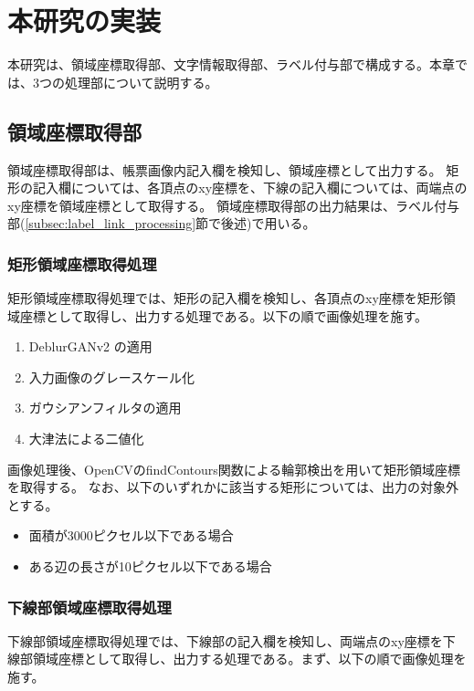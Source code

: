 \chapter{本研究の実装}\label{cha:Implementation}
本研究は、領域座標取得部、文字情報取得部、ラベル付与部で構成する。本章では、3つの処理部について説明する。


\section{領域座標取得部}\label{sec:area_coords_obtainment_part}
領域座標取得部は、帳票画像内記入欄を検知し、領域座標として出力する。
矩形の記入欄については、各頂点のxy座標を、下線の記入欄については、両端点のxy座標を領域座標として取得する。
領域座標取得部の出力結果は、ラベル付与部(\ref{subsec:label_link_processing}節で後述)で用いる。


\subsection{矩形領域座標取得処理}\label{subsec:rect_coords_obtainment_processing}
矩形領域座標取得処理では、矩形の記入欄を検知し、各頂点のxy座標を矩形領域座標として取得し、出力する処理である。以下の順で画像処理を施す。

\begin{enumerate}
    \item DeblurGANv2 の適用
    \item 入力画像のグレースケール化
    \item ガウシアンフィルタの適用
    \item 大津法による二値化
\end{enumerate}

画像処理後、OpenCVのfindContours関数による輪郭検出を用いて矩形領域座標を取得する。
なお、以下のいずれかに該当する矩形については、出力の対象外とする。

\begin{itemize}
    \item 面積が3000ピクセル以下である場合
    \item ある辺の長さが10ピクセル以下である場合
\end{itemize}


\subsection{下線部領域座標取得処理}\label{subsec:underline_coords_obtainment_processing}
下線部領域座標取得処理では、下線部の記入欄を検知し、両端点のxy座標を下線部領域座標として取得し、出力する処理である。まず、以下の順で画像処理を施す。


